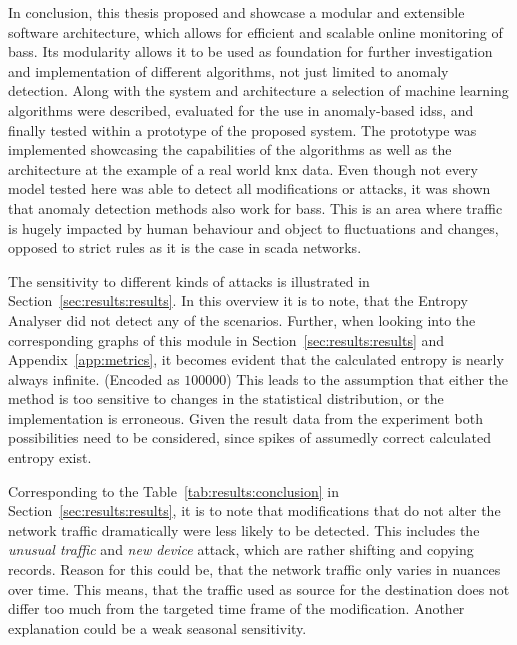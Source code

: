 In conclusion, this thesis proposed and showcase a modular and extensible software architecture, which allows for efficient and scalable online monitoring of \glspl{bas}.
Its modularity allows it to be used as foundation for further investigation and implementation of different algorithms, not just limited to anomaly detection.
Along with the system and architecture a selection of machine learning algorithms were described, evaluated for the use in anomaly-based \glspl{ids}, and finally tested within a prototype of the proposed system.
The prototype was implemented showcasing the capabilities of the algorithms as well as the architecture at the example of a real world \gls{knx} data.
Even though not every model tested here was able to detect all modifications or attacks, it was shown that anomaly detection methods also work for \glspl{bas}. This is an area where traffic is hugely impacted by human behaviour and object to fluctuations and changes, opposed to strict rules as it is the case in \gls{scada} networks.

The sensitivity to different kinds of attacks is illustrated in Section~\ref{sec:results:results}.
In this overview it is to note, that the Entropy Analyser did not detect any of the scenarios. Further, when looking into the corresponding graphs of this module in Section~\ref{sec:results:results} and Appendix~\ref{app:metrics}, it becomes evident that the calculated entropy is nearly always infinite. (Encoded as \(100 000\)) 
This leads to the assumption that either the method is too sensitive to changes in the statistical distribution, or the implementation is erroneous. Given the result data from the experiment both possibilities need to be considered, since spikes of assumedly correct calculated entropy exist.

Corresponding to the Table~\ref{tab:results:conclusion} in Section~\ref{sec:results:results}, it is to note that modifications that do not alter the network traffic dramatically were less likely to be detected. This includes the \emph{unusual traffic} and \emph{new device} attack, which are rather shifting and copying records.
Reason for this could be, that the network traffic only varies in nuances over time.
This means, that the traffic used as source for the destination does not differ too much from the targeted time frame of the modification.
Another explanation could be a weak seasonal sensitivity.

